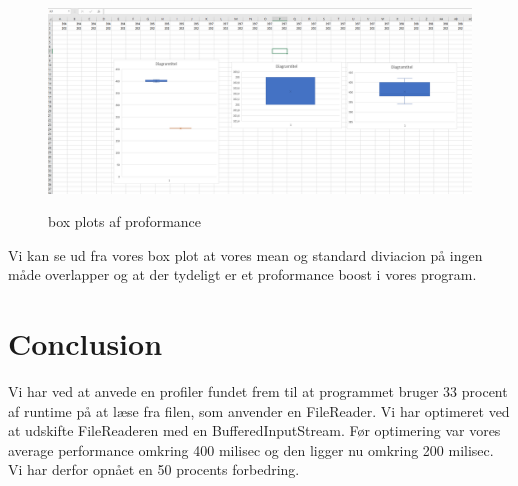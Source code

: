 \documentclass[12pt]{article}
\begin{document}
\begin{figure}[h!]
\begin{center}
\caption{box plots af proformance}
\includegraphics[width=15cm]{box plot.PNG}
\label{fig:cclogo}
\end{center}
\label{fig:firstFigureLabel}
\end{figure}





Vi kan se ud fra vores box plot at vores mean og standard diviacion på ingen måde overlapper og at der tydeligt er et proformance boost i vores program.  \\

\newpage
\section{Conclusion}
Vi har ved at anvede en profiler fundet frem til at programmet bruger 33 procent af runtime på at læse fra filen, som anvender en FileReader. Vi har optimeret ved at udskifte FileReaderen med en BufferedInputStream. Før optimering var vores average performance omkring 400 milisec og den ligger nu omkring 200 milisec. Vi har derfor opnået en 50 procents forbedring.
\end{document}
